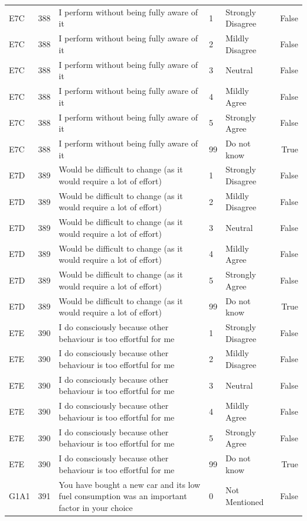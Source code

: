 \begin{tabular}{lrlllr}
E7C & 388 & I perform without being fully aware of it & 1 & Strongly Disagree & False \\
E7C & 388 & I perform without being fully aware of it & 2 & Mildly Disagree & False \\
E7C & 388 & I perform without being fully aware of it & 3 & Neutral & False \\
E7C & 388 & I perform without being fully aware of it & 4 & Mildly Agree & False \\
E7C & 388 & I perform without being fully aware of it & 5 & Strongly Agree & False \\
E7C & 388 & I perform without being fully aware of it & 99 & Do not know & True \\
E7D & 389 & Would be difficult to change (as it would require a lot of effort) & 1 & Strongly Disagree & False \\
E7D & 389 & Would be difficult to change (as it would require a lot of effort) & 2 & Mildly Disagree & False \\
E7D & 389 & Would be difficult to change (as it would require a lot of effort) & 3 & Neutral & False \\
E7D & 389 & Would be difficult to change (as it would require a lot of effort) & 4 & Mildly Agree & False \\
E7D & 389 & Would be difficult to change (as it would require a lot of effort) & 5 & Strongly Agree & False \\
E7D & 389 & Would be difficult to change (as it would require a lot of effort) & 99 & Do not know & True \\
E7E & 390 & I do consciously because other behaviour is too effortful for me & 1 & Strongly Disagree & False \\
E7E & 390 & I do consciously because other behaviour is too effortful for me & 2 & Mildly Disagree & False \\
E7E & 390 & I do consciously because other behaviour is too effortful for me & 3 & Neutral & False \\
E7E & 390 & I do consciously because other behaviour is too effortful for me & 4 & Mildly Agree & False \\
E7E & 390 & I do consciously because other behaviour is too effortful for me & 5 & Strongly Agree & False \\
E7E & 390 & I do consciously because other behaviour is too effortful for me & 99 & Do not know & True \\
G1A1 & 391 & You have bought a new car and its low fuel consumption was an important factor in your choice & 0 & Not Mentioned & False \\

\end{tabular}
